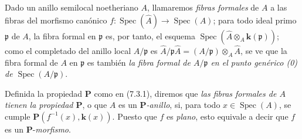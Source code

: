 \begin{env}[7.3.13]
\label{IV.2.s7.3.13-fr}
Dado un anillo semilocal noetheriano $A$, llamaremos \emph{fibras
formales} de $A$ a las fibras del morfismo canónico
$f:\operatorname{Spec}(\widehat A)\to\operatorname{Spec}(A)$; para todo
ideal primo $\mathfrak p$ de $A$, la fibra formal en $\mathfrak p$ es,
por tanto, el esquema
$\operatorname{Spec}(\widehat A\otimes_A \boldsymbol{k}(\mathfrak p))$; como el
completado del anillo local $A/\mathfrak p$ es
$\widehat A/\mathfrak p\widehat A=(A/\mathfrak p)\otimes_A\widehat A$,
se ve que la fibra formal de $A$ en $\mathfrak p$ es también \emph{la
fibra formal de $A/\mathfrak p$ en el punto genérico \textup{(0)} de
$\operatorname{Spec}(A/\mathfrak p)$}.
\end{env}


Definida la propiedad $\boldsymbol P$ como en (7.3.1), diremos que
\emph{las fibras formales de $A$ tienen la propiedad $\boldsymbol P$},
o que $A$ es un \emph{$\boldsymbol P$-anillo}, si, para todo
$x\in\operatorname{Spec}(A)$, se cumple
$\boldsymbol P(f^{-1}(x),\boldsymbol{k}(x))$. Puesto que $f$ es \emph{plano}, esto
equivale a decir que $f$ es un $\boldsymbol P$-\emph{morfismo}.
